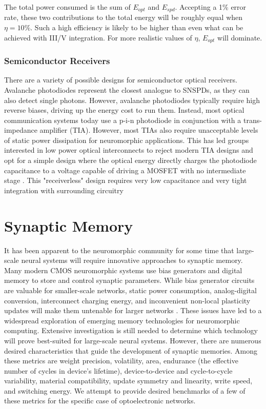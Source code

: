 \documentclass{article}
\begin{document}
The total power consumed is the sum of $E_{opt}$ and $E_{spd}$. Accepting a 1\% error rate, these two contributions to the total energy will be roughly equal when $\eta = 10\%$. Such a high efficiency is likely to be higher than even what can be achieved with III/V integration. For more realistic values of $\eta$, $E_{opt}$ will dominate.

\subsubsection{Semiconductor Receivers}
\quad \quad There are a variety of possible designs for semiconductor optical receivers. Avalanche photodiodes represent the closest analogue to SNSPDs, as they can also detect single photons. However, avalanche photodiodes typically require high reverse biases, driving up the energy cost to run them. Instead, most optical communication systems today use a p-i-n photodiode in conjunction with a trans-impedance amplifier (TIA). However, most TIAs also require unacceptable levels of static power dissipation for neuromorphic applications. This has led groups interested in low power optical interconnects to reject modern TIA designs and opt for a simple design where the optical energy directly charges the photodiode capacitance to a voltage capable of driving a MOSFET with no intermediate stage \cite{miller2017attojoule}. This "receiverless" design requires very low capacitance and very tight integration with surrounding circuitry 

\section{Synaptic Memory}
It has been apparent to the neuromorphic community for some time that large-scale neural systems will require innovative approaches to synaptic memory. Many modern CMOS neuromorphic systems use bias generators and digital memory to store and control synaptic parameters. While bias generator circuits are valuable for smaller-scale networks, static power consumption, analog-digital conversion, interconnect charging energy, and inconvenient non-local plasticity updates will make them untenable for larger networks \cite{dalgaty2019hybrid}. These issues have led to a widespread exploration of emerging memory technologies for neuromorphic computing. Extensive investigation is still needed to determine which technology will prove best-suited for large-scale neural systems. However, there are numerous desired characteristics that guide the development of synaptic memories. Among these metrics are weight precision, volatility, area, endurance (the effective number of cycles in device's lifetime), device-to-device and cycle-to-cycle variability, material compatibility, update symmetry and linearity, write speed, and switching energy. We attempt to provide desired benchmarks of a few of these metrics for the specific case of optoelectronic networks.
\end{document}
